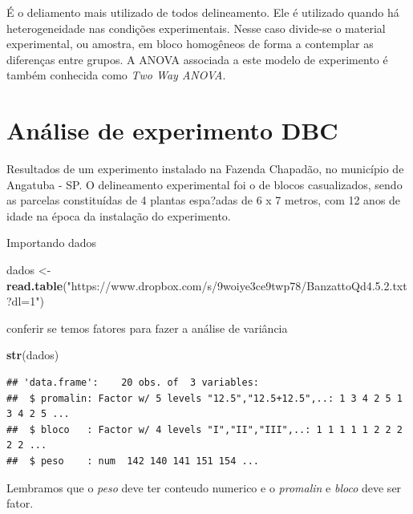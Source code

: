 \documentclass[
]{book}
\newenvironment{Shaded}{\begin{snugshade}}{\end{snugshade}}
\newcommand{\KeywordTok}[1]{\textcolor[rgb]{0.13,0.29,0.53}{\textbf{#1}}}
\newcommand{\NormalTok}[1]{#1}
\newcommand{\OperatorTok}[1]{\textcolor[rgb]{0.81,0.36,0.00}{\textbf{#1}}}
\newcommand{\StringTok}[1]{\textcolor[rgb]{0.31,0.60,0.02}{#1}}
\begin{document}
É o deliamento mais utilizado de todos delineamento. Ele é utilizado quando há heterogeneidade nas condições experimentais. Nesse caso divide-se o material experimental, ou amostra, em bloco homogêneos de forma a contemplar as diferenças entre grupos. A ANOVA associada a este modelo de experimento é também conhecida como \emph{Two Way ANOVA}.

\hypertarget{anuxe1lise-de-experimento-dbc}{%
\section{Análise de experimento DBC}\label{anuxe1lise-de-experimento-dbc}}

Resultados de um experimento instalado na Fazenda Chapadão, no município de Angatuba - SP. O delineamento experimental foi o de blocos casualizados, sendo as parcelas constituídas de 4 plantas espa?adas de 6 x 7 metros, com 12 anos de idade na época da instalação do experimento.

Importando dados

\begin{Shaded}
\begin{Highlighting}[]
\NormalTok{dados <-}\StringTok{ }\KeywordTok{read.table}\NormalTok{(}\StringTok{"https://www.dropbox.com/s/9woiye3ce9twp78/BanzattoQd4.5.2.txt?dl=1"}\NormalTok{) }
\end{Highlighting}
\end{Shaded}

conferir se temos fatores para fazer a análise de variância

\begin{Shaded}
\begin{Highlighting}[]
\KeywordTok{str}\NormalTok{(dados)}
\end{Highlighting}
\end{Shaded}

\begin{verbatim}
## 'data.frame':    20 obs. of  3 variables:
##  $ promalin: Factor w/ 5 levels "12.5","12.5+12.5",..: 1 3 4 2 5 1 3 4 2 5 ...
##  $ bloco   : Factor w/ 4 levels "I","II","III",..: 1 1 1 1 1 2 2 2 2 2 ...
##  $ peso    : num  142 140 141 151 154 ...
\end{verbatim}

Lembramos que o \emph{peso} deve ter conteudo numerico e o \emph{promalin} e \emph{bloco} deve ser fator.

\begin{Shaded}
\end{Shaded}
\end{document}
